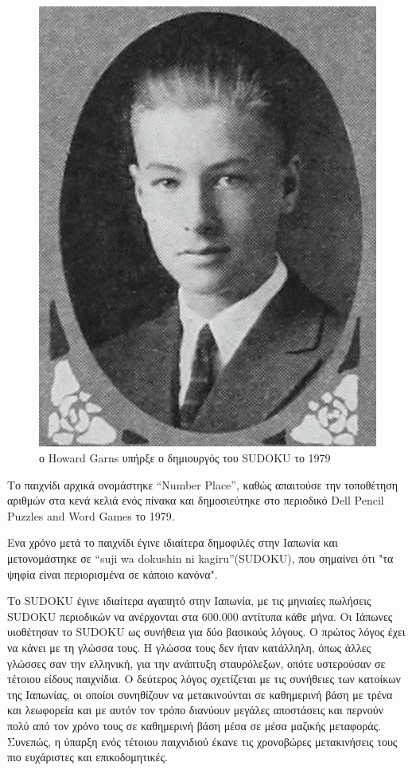 \documentclass[12pt]{book}
\theoremstyle{definition}
\begin{document}
\begin{figure}[h]
	\centering
	\includegraphics[scale=0.3]{Figures/Howard Garns.jpeg}
	\caption{ο Howard Garns υπήρξε ο δημιουργός του SUDOKU το 1979}
\end{figure}

Το παιχνίδι αρχικά ονομάστηκε “Number Place”, καθώς απαιτούσε την τοποθέτηση αριθμών στα κενά κελιά ενός πίνακα και
δημοσιεύτηκε στο περιοδικό Dell Pencil Puzzles and Word
Games το 1979. \par

Ενα χρόνο μετά το παιχνίδι έγινε ιδιαίτερα δημοφιλές στην Ιαπωνία και μετονομάστηκε σε “suji wa dokushin ni
kagiru”(SUDOKU), που σημαίνει ότι "τα ψηφία είναι περιορισμένα σε κάποιο κανόνα". \par

Το SUDOKU έγινε ιδιαίτερα αγαπητό στην Ιαπωνία, με τις μηνιαίες πωλήσεις SUDOKU περιοδικών να ανέρχονται στα
600.000 αντίτυπα κάθε μήνα.
Οι Ιάπωνες υιοθέτησαν το SUDOKU ως συνήθεια για δύο
βασικούς λόγους. Ο πρώτος λόγος έχει να κάνει με τη γλώσσα τους. Η γλώσσα τους δεν ήταν κατάλληλη, όπως άλλες γλώσσες σαν την ελληνική, για την ανάπτυξη σταυρόλεξων, οπότε υστερούσαν σε τέτοιου είδους παιχνίδια. Ο δεύτερος λόγος σχετίζεται με τις συνήθειες των κατοίκων της Ιαπωνίας, οι οποίοι συνηθίζουν να μετακινούνται σε καθημερινή βάση με τρένα και λεωφορεία και με αυτόν τον τρόπο διανύουν μεγάλες αποστάσεις και περνούν πολύ από τον χρόνο τους σε καθημερινή βάση μέσα σε μέσα μαζικής μεταφοράς. Συνεπώς, η ύπαρξη ενός τέτοιου παιχνιδιού έκανε τις χρονοβώρες μετακινήσεις τους πιο ευχάριστες και επικοδομητικές. \par
\end{document}

